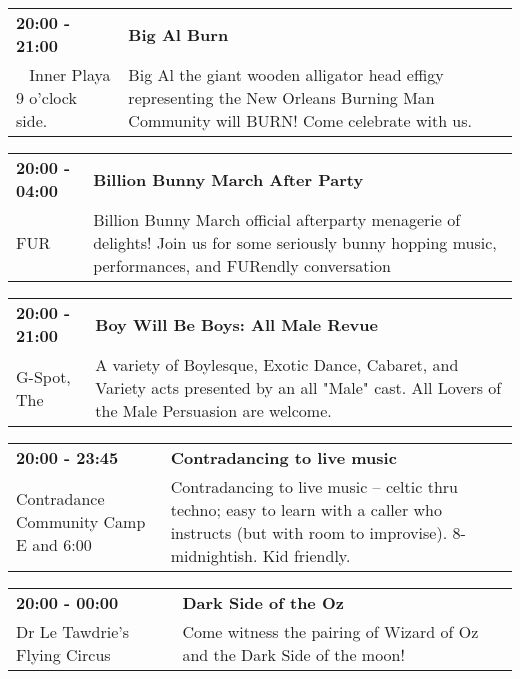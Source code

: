 \begin{tabular}{ p{1in} p{2.2in} }
    \textbf{20:00 - 21:00} & \textbf{Big Al Burn} \\
    ~ \newline Inner Playa 9 o'clock side. & Big Al the giant wooden alligator head effigy representing the New Orleans Burning Man Community will BURN! Come celebrate with us. \\
    \hline 
\end{tabular}
    
\begin{tabular}{ p{1in} p{2.2in} }
    \textbf{20:00 - 04:00} & \textbf{Billion Bunny March After Party} \\
    FUR \newline  & Billion Bunny March official afterparty menagerie of delights! Join us for some seriously bunny hopping music, performances, and FURendly conversation \\
    \hline 
\end{tabular}
    
\begin{tabular}{ p{1in} p{2.2in} }
    \textbf{20:00 - 21:00} & \textbf{Boy Will Be Boys: All Male Revue} \\
    G-Spot, The \newline  & A variety of Boylesque, Exotic Dance, Cabaret, and Variety acts presented by an all "Male" cast.  All Lovers of the Male Persuasion are welcome. \\
    \hline 
\end{tabular}
    
\begin{tabular}{ p{1in} p{2.2in} }
    \textbf{20:00 - 23:45} & \textbf{Contradancing to live music} \\
    Contradance Community Camp \newline E  and 6:00 & Contradancing to live music -- celtic thru techno; easy to learn with a caller who instructs (but with room to improvise). 8-midnightish. Kid friendly. \\
    \hline 
\end{tabular}
    
\begin{tabular}{ p{1in} p{2.2in} }
    \textbf{20:00 - 00:00} & \textbf{Dark Side of the Oz} \\
    Dr Le Tawdrie's Flying Circus \newline  & Come witness the pairing of Wizard of Oz and the Dark Side of the moon! \\
    \hline 
\end{tabular}
    
